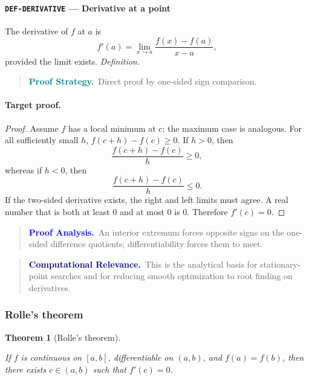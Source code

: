 \documentclass[10pt]{article}
\newcommand{\pidraw}[1]{\begingroup\urlstyle{tt}\nolinkurl{#1}\endgroup}
\newtheorem{theorem}{Theorem}[section]
\theoremstyle{definition}
\theoremstyle{remark}
\newenvironment{proofstrategy}
{\begin{quote}\small\noindent\textbf{\textcolor{teal}{Proof Strategy.}}\ }
{\end{quote}}
\newenvironment{proofanalysis}
{\begin{quote}\small\noindent\textbf{\textcolor{blue}{Proof Analysis.}}\ }
{\end{quote}}
\newenvironment{computationalrelevance}
{\begin{quote}\small\noindent\textbf{\textcolor{navy}{Computational Relevance.}}\ }
{\end{quote}}
\begin{document}
\paragraph{\pidraw{DEF-DERIVATIVE} --- Derivative at a point}
The derivative of $f$ at $a$ is
\[
f'(a)=\lim_{x\to a}\frac{f(x)-f(a)}{x-a},
\]
provided the limit exists.
\textit{Definition.}

\begin{proofstrategy}Direct proof by one-sided sign comparison.\end{proofstrategy}

\paragraph{Target proof.}

\begin{proof}

Assume $f$ has a local minimum at $c$; the maximum case is analogous.
For all sufficiently small $h$,
$f(c+h)-f(c)\ge0$. If $h>0$, then
\[
\frac{f(c+h)-f(c)}{h}\ge0,
\]
whereas if $h<0$, then
\[
\frac{f(c+h)-f(c)}{h}\le0.
\]
If the two-sided derivative exists, the right and left limits must agree.
A real number that is both at least $0$ and at most $0$ is $0$.
Therefore $f'(c)=0$.

\end{proof}

\begin{proofanalysis}An interior extremum forces opposite signs on the one-sided difference quotients; differentiability forces them to meet.\end{proofanalysis}

\begin{computationalrelevance}This is the analytical basis for stationary-point searches and for reducing smooth optimization to root finding on derivatives.\end{computationalrelevance}

\subsubsection{Rolle's theorem}

\begin{theorem}[Rolle's theorem]\label{prf:THM-ROLLE}

If $f$ is continuous on $[a,b]$, differentiable on $(a,b)$, and $f(a)=f(b)$, then there exists $c\in(a,b)$ such that $f'(c)=0$.

\end{theorem}
\end{document}
